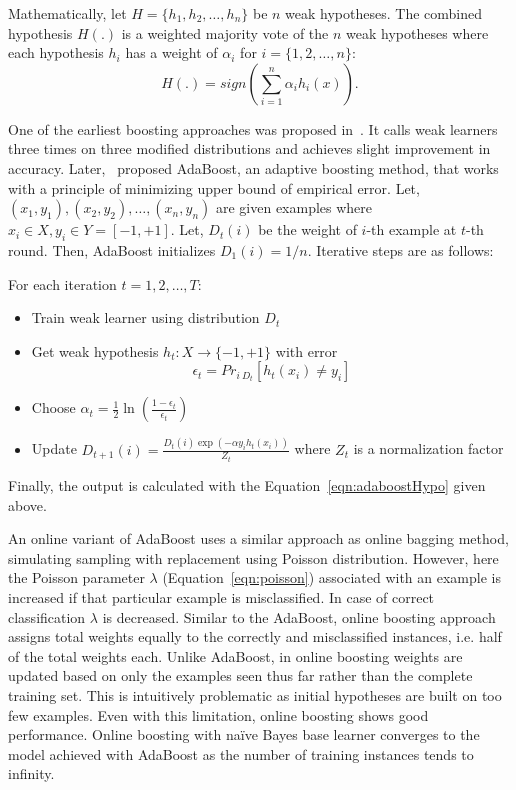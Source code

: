 Mathematically, let $H= \{h_1, h_2, \dots, h_n\}$ be $n$ weak hypotheses. The combined hypothesis $H(.)$ is a weighted majority vote of the $n$ weak hypotheses where each hypothesis $h_i$ has a weight of $\alpha_i$ for $i = \{1, 2, \dots, n\}$:
\begin{equation}
\label{eqn:adaboostHypo}
    H(.) = sign \left(\sum_{i=1}^n \alpha_i h_i(x) \right).
\end{equation}

One of the earliest boosting approaches was proposed in~\cite{schapire90:whyens}. It calls weak learners three times on three modified distributions and achieves slight improvement in accuracy. Later,~\cite{freund97:boosting} proposed AdaBoost, an adaptive boosting method, that works with a principle of minimizing upper bound of empirical error. Let, $(x_1, y_1), (x_2, y_2), \dots, (x_n, y_n)$ are given examples where $x_i \in X, y_i \in Y = [-1, +1]$. Let, $D_t (i)$ be the weight of $i$-th example at $t$-th round. Then, AdaBoost initializes $D_1(i) =1/n$. Iterative steps are as follows:

For each iteration $t= 1, 2, \dots, T$:
\begin{itemize}
    \item Train weak learner using distribution $D_t$
    \item Get weak hypothesis $h_t : X \rightarrow \{-1, +1\}$ with error
    \[
        \epsilon_t = Pr_{i ~ D_t} [h_t(x_i) \ne y_i]
    \]
    \item Choose $\alpha_t = \frac{1}{2} \ln \left( \frac{1 - \epsilon_t}{\epsilon_t} \right)$
    \item Update $D_{t+1} (i) = \frac{D_t(i) \exp(-\alpha y_i h_t(x_i))}{Z_t}$ where $Z_t$ is a normalization factor
\end{itemize}
Finally, the output is calculated with the Equation~\ref{eqn:adaboostHypo} given above.

An online variant of AdaBoost uses a similar approach as online bagging method, simulating sampling with replacement using Poisson distribution. However, here the Poisson parameter $\lambda$ (Equation~\ref{eqn:poisson}) associated with an example is increased if that particular example is misclassified. In case of correct classification $\lambda$ is decreased. Similar to the AdaBoost, online boosting approach assigns total weights equally to the correctly and misclassified instances, i.e. half of the total weights each. Unlike AdaBoost, in online boosting weights are updated based on only the examples seen thus far rather than the complete training set. This is intuitively problematic as initial hypotheses are built on too few examples. Even with this limitation, online boosting shows good performance. Online boosting with na\"ive Bayes base learner converges to the model achieved with AdaBoost as the number of training instances tends to infinity.

